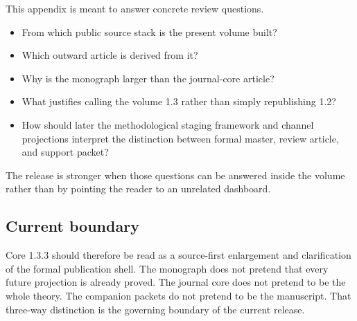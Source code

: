 This appendix is meant to answer concrete review questions.

\begin{itemize}
\item From which public source stack is the present volume built?
\item Which outward article is derived from it?
\item Why is the monograph larger than the journal-core article?
\item What justifies calling the volume 1.3 rather than simply republishing 1.2?
\item How should later the methodological staging framework and channel projections interpret the distinction between formal
      master, review article, and support packet?
\end{itemize}

The release is stronger when those questions can be answered inside the volume rather than by
pointing the reader to an unrelated dashboard.

\subsection{Current boundary}

Core 1.3.3 should therefore be read as a source-first enlargement and clarification of the formal
publication shell.
The monograph does not pretend that every future projection is already proved.
The journal core does not pretend to be the whole theory.
The companion packets do not pretend to be the manuscript.
That three-way distinction is the governing boundary of the current release.
